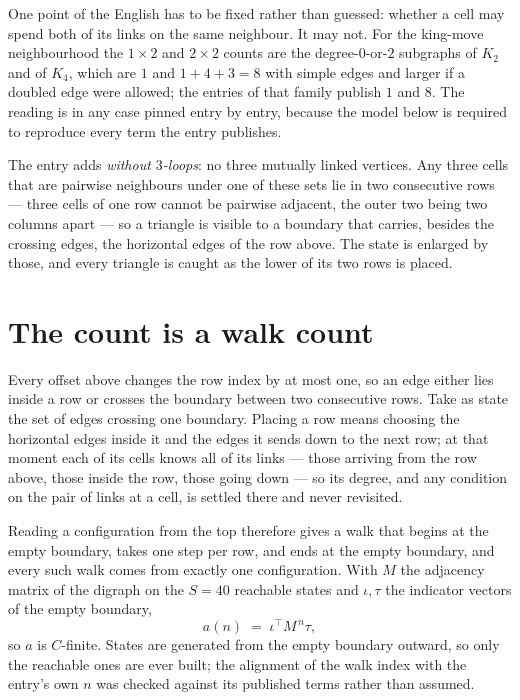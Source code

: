 \documentclass[11pt,a4paper]{article}
\theoremstyle{plain}
\theoremstyle{definition}
\begin{document}
One point of the English has to be fixed rather than guessed: whether a cell may spend both of
its links on the same neighbour. It may not. For the king-move neighbourhood the $1\times2$
and $2\times2$ counts are the degree-$0$-or-$2$ subgraphs of $K_2$ and of $K_4$, which are $1$
and $1+4+3=8$ with simple edges and larger if a doubled edge were allowed; the entries of that
family publish $1$ and $8$. The reading is in any case pinned entry by entry, because the
model below is required to reproduce every term the entry publishes.

The entry adds \emph{without $3$-loops}: no three mutually linked vertices. Any three cells
that are pairwise neighbours under one of these sets lie in two consecutive rows --- three
cells of one row cannot be pairwise adjacent, the outer two being two columns apart --- so a
triangle is visible to a boundary that carries, besides the crossing edges, the horizontal
edges of the row above. The state is enlarged by those, and every triangle is caught as the
lower of its two rows is placed.

\section{The count is a walk count}

Every offset above changes the row index by at most one, so an edge either lies inside a row
or crosses the boundary between two consecutive rows. Take as state the set of edges crossing
one boundary. Placing a row means choosing the horizontal edges inside it and the edges it
sends down to the next row; at that moment each of its cells knows all of its links --- those
arriving from the row above, those inside the row, those going down --- so its degree, and any
condition on the pair of links at a cell, is settled there and never revisited.

Reading a configuration from the top therefore gives a walk that begins at the empty boundary,
takes one step per row, and ends at the empty boundary, and every such walk comes from exactly
one configuration. With $M$ the adjacency matrix of the digraph on the $S=40$ reachable
states and $\iota,\tau$ the indicator vectors of the empty boundary,
\[
a(n)\;=\;\iota^{\!\top}M^{\,n}\tau ,
\]
so $a$ is $C$-finite. States are generated from the empty boundary outward, so only the
reachable ones are ever built; the alignment of the walk index with the entry's own $n$ was
checked against its published terms rather than assumed.
\end{document}
